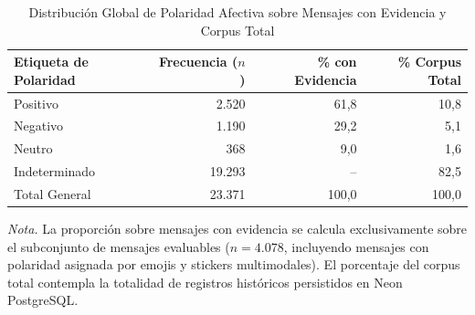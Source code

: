 \begin{table}[htbp]
  \centering
  \small
  \caption{Distribución Global de Polaridad Afectiva sobre Mensajes con Evidencia y Corpus Total}
  \label{tab:distribucion_polaridad}
  \begin{tabular}{lrrr}
    \toprule
    Etiqueta de Polaridad & Frecuencia ($n$) & \% con Evidencia & \% Corpus Total \\
    \midrule
    Positivo              & 2.520            & 61,8             & 10,8            \\
    Negativo              & 1.190            & 29,2             & 5,1             \\
    Neutro                & 368              & 9,0              & 1,6             \\
    Indeterminado         & 19.293           & --               & 82,5            \\
    \midrule
    Total General         & 23.371           & 100,0            & 100,0           \\
    \bottomrule
  \end{tabular}
  \vspace{4pt}
  \begin{minipage}{0.88\textwidth}
    \footnotesize
    \textit{Nota.} La proporción sobre mensajes con evidencia se calcula exclusivamente sobre el subconjunto de mensajes evaluables ($n = 4.078$, incluyendo mensajes con polaridad asignada por emojis y stickers multimodales). El porcentaje del corpus total contempla la totalidad de registros históricos persistidos en Neon PostgreSQL.
  \end{minipage}
\end{table}
